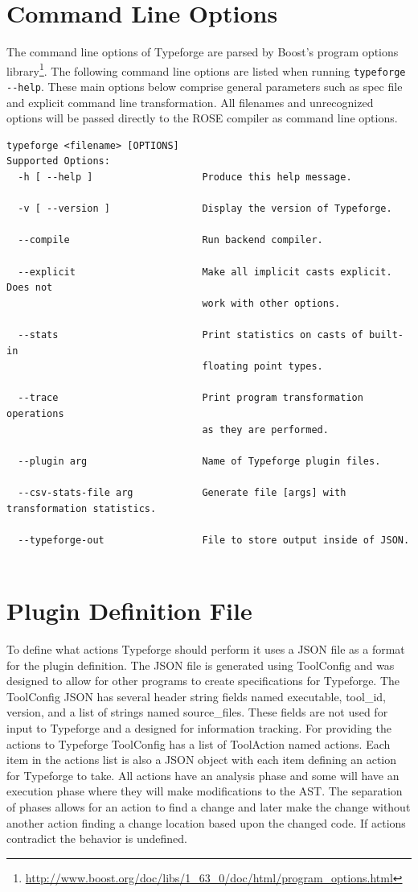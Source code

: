 \documentclass[natbib]{article}
\begin{document}
\section{Command Line Options}
The command line options of Typeforge are parsed by Boost's program options 
library\footnote{\url{http://www.boost.org/doc/libs/1_63_0/doc/html/program_options.html}}.
The following command line options are listed when running \verb+typeforge --help+.
These main options below comprise general parameters such as spec file and explicit command line 
transformation. All filenames and unrecognized options will be passed directly to the ROSE compiler 
as command line options.

\begin{verbatim}
typeforge <filename> [OPTIONS]
Supported Options:
  -h [ --help ]                   Produce this help message.
  
  -v [ --version ]                Display the version of Typeforge.
  
  --compile                       Run backend compiler.
  
  --explicit                      Make all implicit casts explicit. Does not
                                  work with other options.
  
  --stats                         Print statistics on casts of built-in 
                                  floating point types.
                                  
  --trace                         Print program transformation operations 
                                  as they are performed.

  --plugin arg                    Name of Typeforge plugin files.
  
  --csv-stats-file arg            Generate file [args] with transformation statistics.
  
  --typeforge-out                 File to store output inside of JSON.
  
\end{verbatim}
\section{Plugin Definition File}
To define what actions Typeforge should perform it uses a JSON file as a format for the plugin definition. The JSON file is generated using ToolConfig and was designed to allow for other programs to create specifications for Typeforge. The ToolConfig JSON has several header string fields named executable, tool\_id, version, and a list of strings named source\_files. These fields are not used for input to Typeforge and a designed for information tracking. For providing the actions to Typeforge ToolConfig has a list of ToolAction named actions. Each item in the actions list is also a JSON object with each item defining an action for Typeforge to take. All actions have an analysis phase and some will have an execution phase where they will make modifications to the AST. The separation of phases allows for an action to find a change and later make the change without another action finding a change location based upon the changed code. If actions contradict the behavior is undefined.
\end{document}
